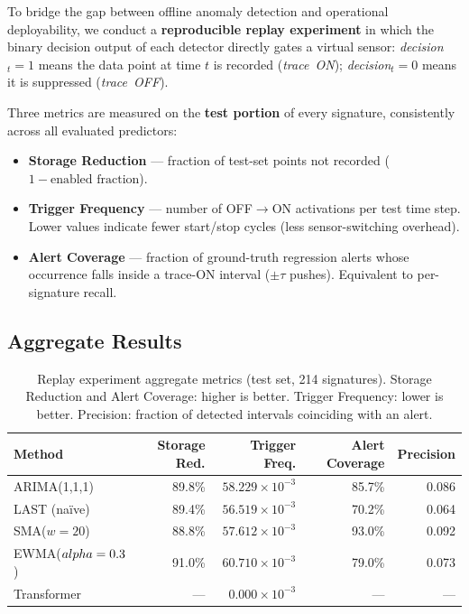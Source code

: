\documentclass[11pt,a4paper]{article}
\begin{document}
To bridge the gap between offline anomaly detection and operational
deployability, we conduct a \textbf{reproducible replay experiment} in
which the binary decision output of each detector directly gates a
virtual sensor: \textit{decision}$_t=1$ means the data point at time $t$
is recorded (\emph{trace~ON}); \textit{decision}$_t=0$ means it is
suppressed (\emph{trace~OFF}).

Three metrics are measured on the \textbf{test portion} of every
signature, consistently across all evaluated predictors:
\begin{itemize}
  \item \textbf{Storage Reduction} --- fraction of test-set points not
        recorded ($1 - \text{enabled fraction}$).
  \item \textbf{Trigger Frequency} --- number of OFF$\to$ON activations
        per test time step. Lower values indicate fewer start/stop cycles
        (less sensor-switching overhead).
  \item \textbf{Alert Coverage} --- fraction of ground-truth regression
        alerts whose occurrence falls inside a trace-ON interval
        ($\pm\tau$ pushes).  Equivalent to per-signature recall.
\end{itemize}


\subsection{Aggregate Results}


\begin{table}[H]
\centering
\caption{Replay experiment aggregate metrics (test set, 214 signatures).
  Storage Reduction and Alert Coverage: higher is better.
  Trigger Frequency: lower is better.
  Precision: fraction of detected intervals coinciding with an alert.}
\label{tab:replay}
\begin{tabular}{lrrrr}
\toprule
Method & Storage Red. & Trigger Freq. & Alert Coverage & Precision \\
\midrule
  ARIMA(1,1,1) & 89.8\% & $58.229\times10^{-3}$ & 85.7\% & 0.086 \\
  LAST (na\"ive) & 89.4\% & $56.519\times10^{-3}$ & 70.2\% & 0.064 \\
  SMA($w=20$) & 88.8\% & $57.612\times10^{-3}$ & 93.0\% & 0.092 \\
  EWMA($\\alpha=0.3$) & 91.0\% & $60.710\times10^{-3}$ & 79.0\% & 0.073 \\
  Transformer & --- & $0.000\times10^{-3}$ & --- & --- \\
\bottomrule
\end{tabular}
\end{table}
\end{document}
